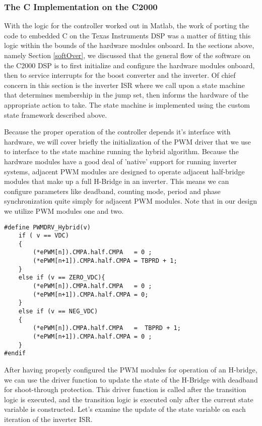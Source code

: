 \subsubsection{The C Implementation on the C2000}
With the logic for the controller worked out in Matlab, the work of porting the code to embedded C on the Texas Instruments DSP was a matter of fitting this logic within the bounds of the hardware modules onboard.
In the sections above, namely Section \ref{softOver}, we discussed that the general flow of the software on the C2000 DSP is to first initialize and configure the hardware modules onboard, then to service interrupts for the boost converter and the inverter. Of chief concern in this section is the inverter ISR where we call upon a state machine that determines membership in the jump set, then informs the hardware of the appropriate action to take. The state machine is implemented using the custom state framework described above.

Because the proper operation of the controller depends it's interface with hardware, we will cover briefly the initialization of the PWM driver that we use to interface to the state machine running the hybrid algorithm. Because the hardware modules have a good deal of 'native' support for running inverter systems, adjacent PWM modules are designed to operate adjacent half-bridge modules that make up a full H-Bridge in an inverter. This means we can configure parameters like deadband, counting mode, period and phase synchronization quite simply for adjacent PWM modules. Note that in our design we utilize PWM modules one and two. 

\begin{lstlisting}
#define PWMDRV_Hybrid(v)
	if ( v == VDC)
	{
		(*ePWM[n]).CMPA.half.CMPA	= 0 ;
		(*ePWM[n+1]).CMPA.half.CMPA	= TBPRD + 1;
	}
	else if (v == ZERO_VDC){
		(*ePWM[n]).CMPA.half.CMPA	= 0 ;
		(*ePWM[n+1]).CMPA.half.CMPA	= 0;
	}
	else if (v == NEG_VDC)
	{
		(*ePWM[n]).CMPA.half.CMPA	=  TBPRD + 1;
		(*ePWM[n+1]).CMPA.half.CMPA	= 0 ;
	}
#endif
\end{lstlisting}

After having properly configured the PWM modules for operation of an H-bridge, we can use the driver function to update the state of the H-Bridge with deadband for shoot-through protection. This driver function is called after the transition logic is executed, and the transition logic is executed only after the current state variable is constructed. Let's examine the update of the state variable on each iteration of the inverter ISR. 


